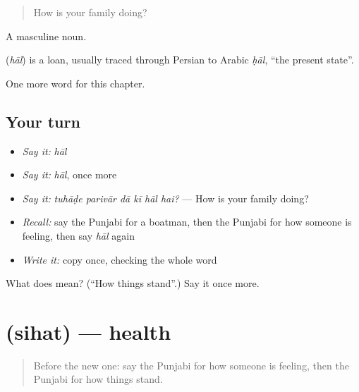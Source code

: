 \begin{quote}
How is your family doing?
\end{quote}

A masculine noun.

\begin{cousinweb}
\textbf{} (\emph{hāl}) is a loan, usually traced through Persian to Arabic \emph{ḥāl}, \textquotedblleft{}the present state\textquotedblright{}.
\end{cousinweb}

\begin{grammarlens}[title={What you've built}]
One more word for this chapter.
\end{grammarlens}

\subsection*{Your turn}
\begin{itemize}
\raggedright
  \item \emph{Say it:} \emph{hāl}
  \item \emph{Say it:} \emph{hāl}, once more
  \item \emph{Say it:} \emph{tuhāḍe parivār dā kī hāl hai?} — How is your family doing?
  \item \emph{Recall:} say the Punjabi for a boatman, then the Punjabi for how someone is feeling, then say \emph{hāl} again
  \item \emph{Write it:} copy \textbf{} once, checking the whole word
\end{itemize}

\begin{tcolorbox}[breakable,colback=teal!4,colframe=teal!35!black,title={Before you move on}]
What does  mean? (\textquotedblleft{}How things stand\textquotedblright{}.) Say it once more.
\end{tcolorbox}
\section[\texorpdfstring{\pa{ਸਿਹਤ} (sihat)}{ਸਿਹਤ (sihat)}]{ (sihat) — health}

\label{lesson:PA-C319-sihat}



\begin{quote}
Before the new one: say the Punjabi for how someone is feeling, then the Punjabi for how things stand.
\end{quote}

